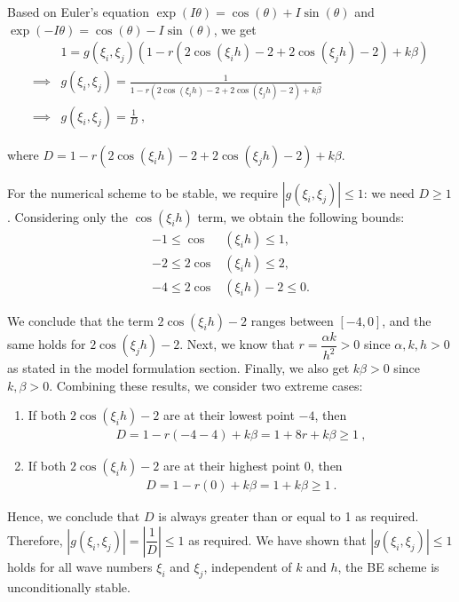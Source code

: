 \documentclass{article}
\begin{document}
\noindent Based on Euler's equation $\exp(I\theta) = \cos(\theta) + I\sin(\theta)$ and $\exp(-I\theta) = \cos(\theta) - I\sin(\theta)$, we get 
\begin{align*}
&1 = g(\xi_i, \xi_j) (1 - r(2\cos(\xi_i h) - 2 + 2\cos(\xi_j h) - 2) + k\beta) \\
\implies & g(\xi_i, \xi_j) = \frac{1}{1 - r(2\cos(\xi_i h) - 2 + 2\cos(\xi_j h) - 2) + k\beta} \\
\implies & g(\xi_i, \xi_j) = \frac{1}{D} \ , \tag{3.5}
\end{align*}

\noindent where $D = 1 - r(2\cos(\xi_i h) - 2 + 2\cos(\xi_j h) - 2) + k\beta$. 

\vspace{3mm}

\noindent For the numerical scheme to be stable, we require $|g(\xi_i, \xi_j)| \le 1$: we need $D \ge 1$. Considering only the $\cos(\xi_i h)$ term, we obtain the following bounds:
\begin{align*}
    -1 \le \cos&(\xi_i h) \le 1 , \\ 
    -2 \le 2\cos&(\xi_i h) \le 2 , \\
    -4 \le 2\cos&(\xi_i h) - 2 \le 0 .
\end{align*}

\noindent We conclude that the term $2\cos(\xi_ih)-2$ ranges between $[-4, 0]$, and the same holds for $2\cos(\xi_j h)-2$. Next, we know that $r = \dfrac{\alpha k}{h^2} > 0$ since $\alpha, k, h > 0$ as stated in the model formulation section. Finally, we also get $k\beta>0$ since $k, \beta>0$. Combining these results, we consider two extreme cases: 
\begin{enumerate}
    \item If both $2\cos(\xi_i h) - 2$ are at their lowest point $-4$, then 
\begin{align*}
    D = 1 - r(-4 - 4) + k\beta = 1 + 8r + k\beta \ge 1 \ ,
\end{align*}

\item If both $2\cos(\xi_i h) - 2$ are at their highest point $0$, then
\begin{align*}
    D = 1 - r(0) + k\beta = 1 + k\beta \ge 1 \ .
\end{align*}
\end{enumerate}

\noindent Hence, we conclude that $D$ is always greater than or equal to 1 as required. Therefore, $|g(\xi_i, \xi_j)| = \left| \dfrac{1}{D} \right| \le 1$ as required. We have shown that $|g(\xi_i, \xi_j)|\le 1$ holds for all wave numbers $\xi_i$ and $\xi_j$, independent of $k$ and $h$, the BE scheme is unconditionally stable.
\end{document}
